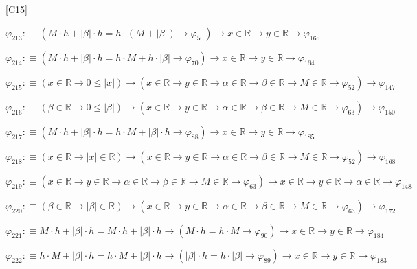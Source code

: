 \begin{fullproof}{[C15]}
\begin{abbrevlist}
\item $\varphi_{213} :\equiv (M \cdot h + \lvert \beta \rvert \cdot h = h \cdot (M + \lvert \beta \rvert) \to \varphi_{50}) \to x \in \mathbb{R} \to y \in \mathbb{R} \to \varphi_{165}$
\item $\varphi_{214} :\equiv (M \cdot h + \lvert \beta \rvert \cdot h = h \cdot M + h \cdot \lvert \beta \rvert \to \varphi_{70}) \to x \in \mathbb{R} \to y \in \mathbb{R} \to \varphi_{164}$
\item $\varphi_{215} :\equiv (x \in \mathbb{R} \to 0 \leq \lvert x \rvert) \to (x \in \mathbb{R} \to y \in \mathbb{R} \to \alpha \in \mathbb{R} \to \beta \in \mathbb{R} \to M \in \mathbb{R} \to \varphi_{52}) \to \varphi_{147}$
\item $\varphi_{216} :\equiv (\beta \in \mathbb{R} \to 0 \leq \lvert \beta \rvert) \to (x \in \mathbb{R} \to y \in \mathbb{R} \to \alpha \in \mathbb{R} \to \beta \in \mathbb{R} \to M \in \mathbb{R} \to \varphi_{63}) \to \varphi_{150}$
\item $\varphi_{217} :\equiv (M \cdot h + \lvert \beta \rvert \cdot h = h \cdot M + \lvert \beta \rvert \cdot h \to \varphi_{88}) \to x \in \mathbb{R} \to y \in \mathbb{R} \to \varphi_{185}$
\item $\varphi_{218} :\equiv (x \in \mathbb{R} \to \lvert x \rvert \in \mathbb{R}) \to (x \in \mathbb{R} \to y \in \mathbb{R} \to \alpha \in \mathbb{R} \to \beta \in \mathbb{R} \to M \in \mathbb{R} \to \varphi_{52}) \to \varphi_{168}$
\item $\varphi_{219} :\equiv (x \in \mathbb{R} \to y \in \mathbb{R} \to \alpha \in \mathbb{R} \to \beta \in \mathbb{R} \to M \in \mathbb{R} \to \varphi_{63}) \to x \in \mathbb{R} \to y \in \mathbb{R} \to \alpha \in \mathbb{R} \to \varphi_{148}$
\item $\varphi_{220} :\equiv (\beta \in \mathbb{R} \to \lvert \beta \rvert \in \mathbb{R}) \to (x \in \mathbb{R} \to y \in \mathbb{R} \to \alpha \in \mathbb{R} \to \beta \in \mathbb{R} \to M \in \mathbb{R} \to \varphi_{63}) \to \varphi_{172}$
\item $\varphi_{221} :\equiv M \cdot h + \lvert \beta \rvert \cdot h = M \cdot h + \lvert \beta \rvert \cdot h \to (M \cdot h = h \cdot M \to \varphi_{90}) \to x \in \mathbb{R} \to y \in \mathbb{R} \to \varphi_{184}$
\item $\varphi_{222} :\equiv h \cdot M + \lvert \beta \rvert \cdot h = h \cdot M + \lvert \beta \rvert \cdot h \to (\lvert \beta \rvert \cdot h = h \cdot \lvert \beta \rvert \to \varphi_{89}) \to x \in \mathbb{R} \to y \in \mathbb{R} \to \varphi_{183}$

\end{abbrevlist}
\end{fullproof}
